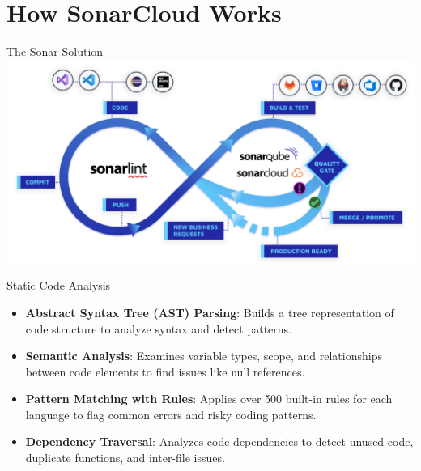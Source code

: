 \documentclass{beamer}
\begin{document}
\section[How SonarCloud Works]{How SonarCloud Works}

\begin{frame}{The Sonar Solution}
  \vspace{0.6em}
  \includegraphics[scale=0.22]{fig/sonar_solution.png}
\end{frame}


\begin{frame}{Static Code Analysis}
  \begin{itemize}
    \item \textbf{Abstract Syntax Tree (AST) Parsing}: Builds a tree representation of code structure to analyze syntax and detect patterns.
    \item \textbf{Semantic Analysis}: Examines variable types, scope, and relationships between code elements to find issues like null references.
    \item \textbf{Pattern Matching with Rules}: Applies over 500 built-in rules for each language to flag common errors and risky coding patterns.
    \item \textbf{Dependency Traversal}: Analyzes code dependencies to detect unused code, duplicate functions, and inter-file issues.
\end{itemize}
\end{frame}
\end{document}

